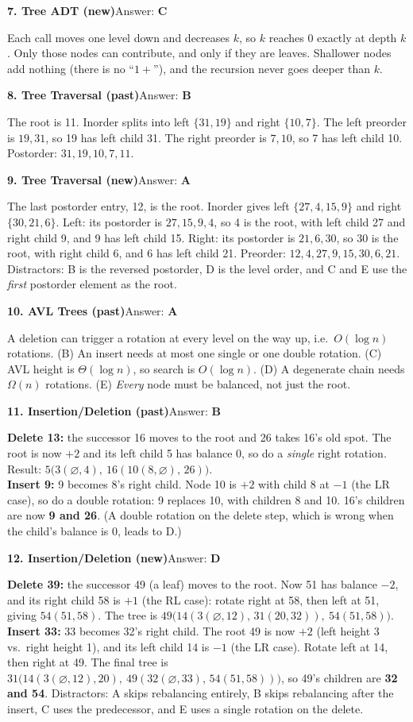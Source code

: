 \documentclass[11pt]{article}
\newcommand{\answer}[2]{\par\medskip\noindent\textbf{#1}\quad Answer: \textbf{#2}\par\nobreak\smallskip}
\begin{document}
\answer{7. Tree ADT (new)}{C}
Each call moves one level down and decreases $k$, so $k$ reaches 0 exactly at depth $k$. Only those nodes can contribute,
and only if they are leaves. Shallower nodes add nothing (there is no ``$1+$''), and the recursion never goes deeper than $k$.

\answer{8. Tree Traversal (past)}{B}
The root is 11. Inorder splits into left $\{31,19\}$ and right $\{10,7\}$.
The left preorder is $19,31$, so 19 has left child 31. The right preorder is $7,10$, so 7 has left child 10.
Postorder: $31,19,10,7,11$.

\answer{9. Tree Traversal (new)}{A}
The last postorder entry, 12, is the root. Inorder gives left $\{27,4,15,9\}$ and right $\{30,21,6\}$.
Left: its postorder is $27,15,9,4$, so 4 is the root, with left child 27 and right child 9, and 9 has left child 15.
Right: its postorder is $21,6,30$, so 30 is the root, with right child 6, and 6 has left child 21.
Preorder: $12,4,27,9,15,30,6,21$.
Distractors: B is the reversed postorder, D is the level order, and C and E use the \emph{first} postorder element as the root.

\answer{10. AVL Trees (past)}{A}
A deletion can trigger a rotation at every level on the way up, i.e.\ $O(\log n)$ rotations.
(B) An insert needs at most one single or one double rotation.
(C) AVL height is $\Theta(\log n)$, so search is $O(\log n)$.
(D) A degenerate chain needs $\Omega(n)$ rotations.
(E) \emph{Every} node must be balanced, not just the root.

\answer{11. Insertion/Deletion (past)}{B}
\textbf{Delete 13:} the successor 16 moves to the root and 26 takes 16's old spot. The root is now $+2$ and its left child 5 has
balance $0$, so do a \emph{single} right rotation. Result: $5\big(3(\varnothing,4),\ 16(10(8,\varnothing),\,26)\big)$.\\
\textbf{Insert 9:} 9 becomes 8's right child. Node 10 is $+2$ with child 8 at $-1$ (the LR case), so do a double rotation: 9 replaces 10,
with children 8 and 10. 16's children are now \textbf{9 and 26}.
(A double rotation on the delete step, which is wrong when the child's balance is 0, leads to D.)

\answer{12. Insertion/Deletion (new)}{D}
\textbf{Delete 39:} the successor 49 (a leaf) moves to the root. Now 51 has balance $-2$, and its right child 58 is $+1$ (the RL case):
rotate right at 58, then left at 51, giving $54(51,58)$.
The tree is $49\big(14(3(\varnothing,12),\,31(20,32)),\ 54(51,58)\big)$.\\
\textbf{Insert 33:} 33 becomes 32's right child. The root 49 is now $+2$ (left height 3 vs.\ right height 1), and its left child 14 is
$-1$ (the LR case). Rotate left at 14, then right at 49.
The final tree is $31\big(14(3(\varnothing,12),20),\ 49(32(\varnothing,33),\,54(51,58))\big)$, so 49's children are \textbf{32 and 54}.
Distractors: A skips rebalancing entirely, B skips rebalancing after the insert, C uses the predecessor, and E uses a single rotation on the delete.
\end{document}

